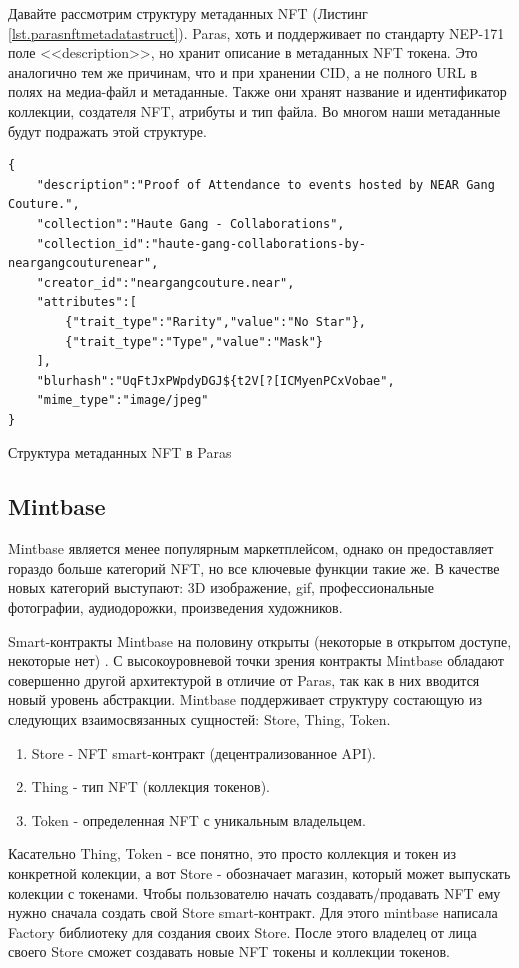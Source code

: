 Давайте рассмотрим структуру метаданных NFT (Листинг {\color{blue}\ref{lst.parasnftmetadatastruct}}). Paras, хоть и поддерживает по стандарту NEP-171 поле <<description>>, но хранит описание в метаданных NFT токена. Это аналогично тем же причинам, что и при хранении CID, а не полного URL в полях на медиа-файл и метаданные. Также они хранят название и идентификатор коллекции, создателя NFT, атрибуты и тип файла. Во многом наши метаданные будут подражать этой структуре.

\begin{listing}
\begin{verbatim}
{
    "description":"Proof of Attendance to events hosted by NEAR Gang Couture.",
    "collection":"Haute Gang - Collaborations",
    "collection_id":"haute-gang-collaborations-by-neargangcouturenear",
    "creator_id":"neargangcouture.near",
    "attributes":[
        {"trait_type":"Rarity","value":"No Star"},
        {"trait_type":"Type","value":"Mask"}
    ],
    "blurhash":"UqFtJxPWpdyDGJ${t2V[?[ICMyenPCxVobae",
    "mime_type":"image/jpeg"
}
\end{verbatim}
\caption{Структура метаданных NFT в Paras}
\label{lst.parasnftmetadatastruct}
\end{listing}


\subsection{Mintbase}

Mintbase является менее популярным маркетплейсом, однако он предоставляет гораздо больше категорий NFT, но все ключевые функции такие же. В качестве новых категорий выступают: 3D изображение, gif, профессиональные фотографии, аудиодорожки, произведения художников.

Smart-контракты Mintbase на половину открыты (некоторые в открытом доступе, некоторые нет) \cite{mintbasecontracts}. С высокоуровневой точки зрения контракты Mintbase обладают совершенно другой архитектурой в отличие от Paras, так как в них вводится новый уровень абстракции.
Mintbase поддерживает структуру состающую из следующих взаимосвязанных сущностей: Store, Thing, Token.
\begin{enumerate}
    \item Store - NFT smart-контракт (децентрализованное API).
    \item Thing - тип NFT (коллекция токенов).
    \item Token - определенная NFT с уникальным владельцем.
\end{enumerate}
Касательно Thing, Token - все понятно, это просто коллекция и токен из конкретной колекции, а вот Store - обозначает магазин, который может выпускать колекции с токенами.
Чтобы пользователю начать создавать/продавать NFT ему нужно сначала создать свой Store smart-контракт. Для этого mintbase написала Factory библиотеку для создания своих Store.
После этого владелец от лица своего Store сможет создавать новые NFT токены и коллекции токенов.

